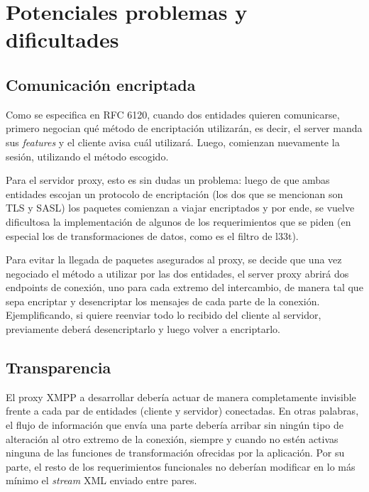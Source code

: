 \documentclass[a4paper,10pt]{article}
\begin{document}


\section{Potenciales problemas y dificultades}

\subsection{Comunicación encriptada}
Como se especifica en RFC 6120, cuando dos entidades quieren comunicarse, primero negocian qué método de encriptación utilizarán, es decir, el server manda sus \textit{features}
y el cliente avisa cuál utilizará. Luego, comienzan nuevamente la sesión, utilizando el método escogido.
\par Para el servidor proxy, esto es sin dudas un problema: luego de que ambas entidades escojan un protocolo de encriptación (los dos que se mencionan
son TLS y SASL) los paquetes comienzan a viajar encriptados y por ende, se vuelve dificultosa la implementación de algunos de los requerimientos que se piden (en especial los de transformaciones de datos, como es el filtro de l33t).
\par Para evitar la llegada de paquetes asegurados al proxy, se decide que una vez negociado el método a utilizar por las dos entidades, el server proxy abrirá dos endpoints de conexión, uno para cada extremo del intercambio, de manera tal que sepa encriptar y desencriptar los mensajes de cada
parte de la conexión. Ejemplificando, si quiere reenviar todo lo recibido del cliente al servidor, previamente deberá desencriptarlo y luego volver a encriptarlo.

\subsection{Transparencia}
El proxy XMPP a desarrollar debería actuar de manera completamente invisible frente a cada par de entidades (cliente y servidor) conectadas.
En otras palabras, el flujo de información que envía una parte debería arribar sin ningún tipo de alteración al otro extremo
de la conexión, siempre y cuando no estén activas ninguna de las funciones de transformación ofrecidas por la aplicación. Por su parte, el resto
de los requerimientos funcionales no deberían modificar en lo más mínimo el \textit{stream} XML enviado entre pares.
\end{document}
